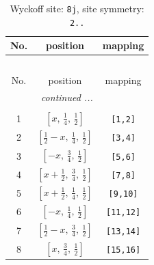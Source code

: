 \documentclass[fleqn,8pt]{jsarticle}
\begin{document}
\begin{longtable}{ccc}
\caption{Wyckoff site: {\tt 8j}, site symmetry: {\tt 2..}}
 \\
 \hline \hline
No. & position & mapping \\ \hline \endfirsthead

\multicolumn{2}{l}{\tablename\ \thetable{}} \\
 \hline \hline
No. & position & mapping \\ \hline \endhead

 \hline \hline
\multicolumn{2}{r}{\footnotesize\it continued ...} \\ \endfoot

 \hline \hline
\multicolumn{2}{r}{} \\ \endlastfoot

1 & $\left[ x,\, \frac{1}{4},\, \frac{1}{2} \right]$ & {\tt [1,2]} \\ \hline
2 & $\left[ \frac{1}{2} - x,\, \frac{1}{4},\, \frac{1}{2} \right]$ & {\tt [3,4]} \\ \hline
3 & $\left[ - x,\, \frac{3}{4},\, \frac{1}{2} \right]$ & {\tt [5,6]} \\ \hline
4 & $\left[ x + \frac{1}{2},\, \frac{3}{4},\, \frac{1}{2} \right]$ & {\tt [7,8]} \\ \hline
5 & $\left[ x + \frac{1}{2},\, \frac{1}{4},\, \frac{1}{2} \right]$ & {\tt [9,10]} \\ \hline
6 & $\left[ - x,\, \frac{1}{4},\, \frac{1}{2} \right]$ & {\tt [11,12]} \\ \hline
7 & $\left[ \frac{1}{2} - x,\, \frac{3}{4},\, \frac{1}{2} \right]$ & {\tt [13,14]} \\ \hline
8 & $\left[ x,\, \frac{3}{4},\, \frac{1}{2} \right]$ & {\tt [15,16]} \\
\end{longtable}
\renewcommand{\arraystretch}{1.2}
\end{document}
